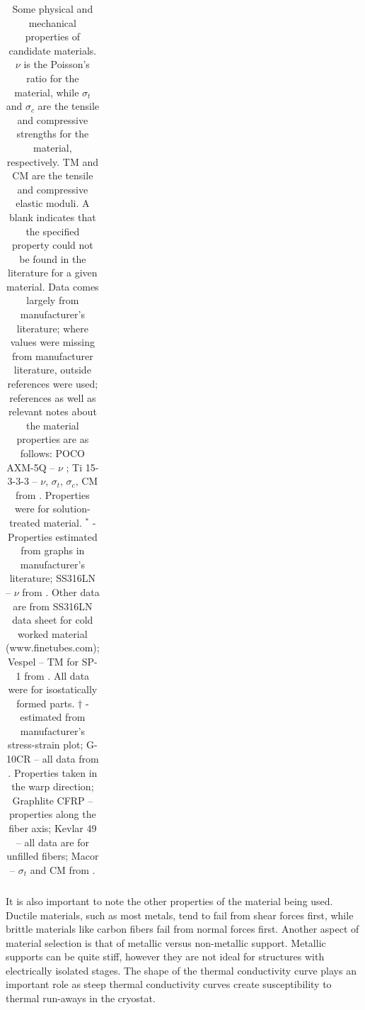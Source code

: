 \documentclass[final]{svjour2}
\begin{document}
\begin{table}[h]
\begin{tabular}{lrrrrrr}
 \bottomrule
\end{tabular}
\caption{Some physical and mechanical properties of candidate materials. $\nu$ is the Poisson's ratio for the material, while $\sigma_{t}$ and $\sigma_{c}$ are the tensile and compressive strengths for the material, respectively. TM and CM are the tensile and compressive elastic moduli. A blank indicates that the specified property could not be found in the literature for a given material. Data comes largely from manufacturer's literature; where values were missing from manufacturer literature, outside references were used; references as well as relevant notes about the material properties are as follows: POCO AXM-5Q -- $\nu$ \cite{Swank2009}; Ti 15-3-3-3 -- $\nu$, $\sigma_t$, $\sigma_c$, CM from \cite{Lang2001}\cite{Johnson1996}\cite{Nyakana2005}. Properties were for solution-treated material. $^*$ - Properties estimated from graphs in manufacturer's literature; SS316LN -- $\nu$ from \cite{Shankar2001}. Other data are from SS316LN data sheet for cold worked material (www.finetubes.com); Vespel -- TM for SP-1 from \cite{Doty1981}. All data were for isostatically formed parts. $\dag$ - estimated from manufacturer's stress-strain plot; G-10CR -- all data from \cite{Kasen1981}\cite{Markley1985}. Properties taken in the warp direction; Graphlite CFRP -- properties along the fiber axis; Kevlar 49 -- all data are for unfilled fibers; Macor -- $\sigma_t$ and CM from \cite{Markley1985}\cite{websiteMacor}.}
\label{SW}
\end{table}

It is also important to note the other properties of the material being used.  Ductile materials, such as most metals, tend to fail from shear forces first, while brittle materials like carbon fibers fail from normal forces first.  Another aspect of material selection is that of metallic versus non-metallic support. Metallic supports can be quite stiff, however they are not ideal for structures with electrically isolated stages.  The shape of the thermal conductivity curve plays an important role as steep thermal conductivity curves create susceptibility to thermal run-aways in the cryostat.
\end{document}
